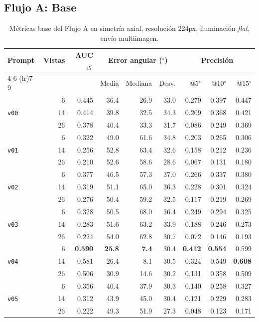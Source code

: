 \newpage

\clearpage
\subsection{Flujo A: Base}

\begin{table}[!h]
\centering
\caption{Métricas base del Flujo A en simetría axial, resolución 224px, iluminación \textit{flat}, envío multiimagen.}
\label{tab:nov_axis_base}
\footnotesize
\setlength{\tabcolsep}{3pt}

\begin{tabular*}{\textwidth}{@{\extracolsep{\fill}}lrrrrrrrr@{}}
\toprule
\multirow{2}{*}{Prompt} & \multirow{2}{*}{Vistas} & \multirow{2}{*}{AUC$_{45^\circ}$} & \multicolumn{3}{c}{Error angular ($^\circ$)} & \multicolumn{3}{c}{Precisión} \\
\cmidrule(lr){4-6} \cmidrule(lr){7-9}
 &  &  & Media & Mediana & Desv. & @5$^\circ$ & @10$^\circ$ & @15$^\circ$ \\
\midrule
\multirow{3}{*}{\texttt{v00}} & 6 & 0.445 & 36.4 & 26.9 & 33.0 & 0.279 & 0.397 & 0.447 \\
 & 14 & 0.414 & 39.8 & 32.5 & 34.3 & 0.209 & 0.368 & 0.421 \\
 & 26 & 0.378 & 40.4 & 33.3 & 31.7 & 0.086 & 0.249 & 0.369 \\
\midrule
\multirow{3}{*}{\texttt{v01}} & 6 & 0.322 & 49.0 & 61.6 & 34.8 & 0.203 & 0.265 & 0.306 \\
 & 14 & 0.256 & 52.8 & 63.4 & 32.6 & 0.158 & 0.212 & 0.236 \\
 & 26 & 0.210 & 52.6 & 58.6 & 28.6 & 0.067 & 0.131 & 0.180 \\
\midrule
\multirow{3}{*}{\texttt{v02}} & 6 & 0.377 & 46.5 & 57.3 & 37.0 & 0.266 & 0.337 & 0.380 \\
 & 14 & 0.319 & 51.1 & 65.0 & 36.3 & 0.228 & 0.301 & 0.324 \\
 & 26 & 0.276 & 50.4 & 59.2 & 32.5 & 0.117 & 0.219 & 0.269 \\
\midrule
\multirow{3}{*}{\texttt{v03}} & 6 & 0.328 & 50.5 & 68.0 & 36.4 & 0.249 & 0.294 & 0.325 \\
 & 14 & 0.283 & 51.6 & 63.2 & 33.9 & 0.188 & 0.246 & 0.273 \\
 & 26 & 0.224 & 54.0 & 62.8 & 30.7 & 0.072 & 0.146 & 0.193 \\
\midrule
\multirow{3}{*}{\texttt{v04}} & 6 & \textbf{0.590} & \textbf{25.8} & \textbf{7.4} & 30.4 & \textbf{0.412} & \textbf{0.554} & 0.599 \\
 & 14 & 0.581 & 26.4 & 8.1 & 30.5 & 0.324 & 0.549 & \textbf{0.608} \\
 & 26 & 0.506 & 30.9 & 14.6 & 30.2 & 0.131 & 0.358 & 0.509 \\
\midrule
\multirow{3}{*}{\texttt{v05}} & 6 & 0.356 & 40.4 & 37.9 & 30.3 & 0.140 & 0.258 & 0.327 \\
 & 14 & 0.312 & 43.9 & 45.0 & 30.4 & 0.121 & 0.229 & 0.283 \\
 & 26 & 0.222 & 49.3 & 51.9 & 27.3 & 0.048 & 0.123 & 0.171 \\
\bottomrule
\end{tabular*}


\end{table}
